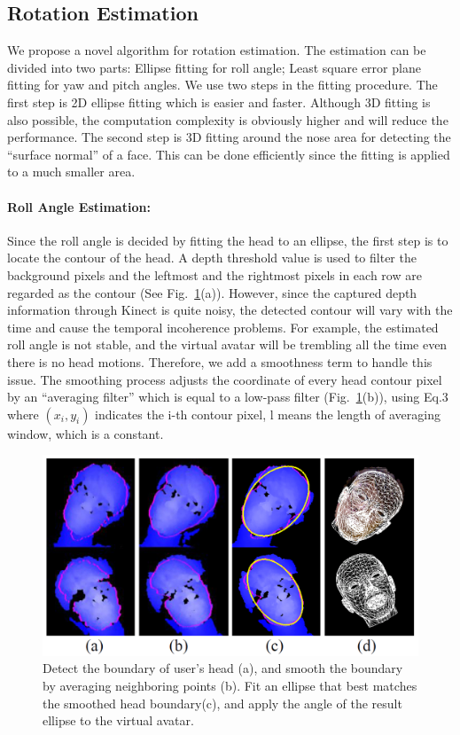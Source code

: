 \subsection{Rotation Estimation}
\label{sec:3.3}
We propose a novel algorithm for rotation estimation. The estimation can be divided into two parts: Ellipse fitting for roll angle; Least square error plane fitting for yaw and pitch angles. We use two steps in the fitting procedure. The first step is 2D ellipse fitting which is easier and faster. Although 3D fitting is also possible, the computation complexity is obviously higher and will reduce the performance.  The second step is 3D fitting around the nose area for detecting the “surface normal” of a face. This can be done efficiently since  the fitting is applied to a much smaller area.

\paragraph{Roll Angle Estimation:}
Since the roll angle is decided by fitting the head to an ellipse, the first step is to locate the contour of the head. A depth threshold value is used to filter the background pixels and the leftmost and the rightmost pixels in each row are regarded as the contour (See Fig.~\ref{fig:6}(a)). However, since the captured depth information through Kinect is quite noisy, the detected contour will vary with the time and cause the temporal incoherence problems. For example, the estimated roll angle is not stable, and the virtual avatar will be trembling all the time even there is no head motions. Therefore, we add a smoothness term to handle this issue. The smoothing process adjusts the coordinate of every head contour pixel by an “averaging filter” which is equal to a low-pass filter (Fig.~\ref{fig:6}(b)), using Eq.3 where $(x_{i},y_{i})$ indicates the i-th contour pixel, l means the length of averaging window, which is a constant.

\begin{figure}
\includegraphics[width=1.0\linewidth]{./fig6.png}
\caption{Detect the boundary of user’s head (a), and smooth the boundary by averaging neighboring points (b). Fit an ellipse that best matches the smoothed head boundary(c), and apply the angle of the result ellipse to the virtual avatar.}
\label{fig:6}       %
\end{figure}


